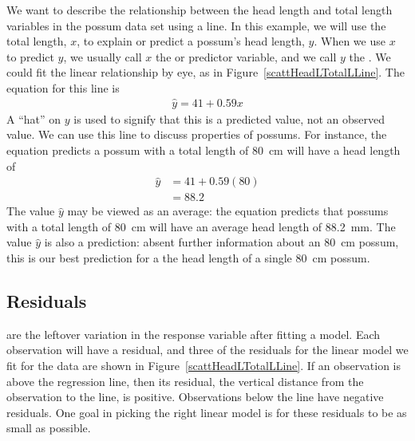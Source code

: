 We want to describe the relationship between the head length and total length variables in the possum data set using a line. In this example, we will use the total length, $x$, to explain or predict a possum's head length, $y$. When we use $x$ to predict $y$, we usually call $x$ the  or predictor variable, and we call $y$ the .  We could fit the linear relationship by eye, as in Figure~\ref{scattHeadLTotalLLine}. The equation for this line is
\begin{eqnarray*}
\hat{y} = 41 + 0.59x
\label{headLLinModTotalL}
\end{eqnarray*}
A ``hat'' on $y$ is used to signify that this is a predicted value, not an observed value.  We can use this line to discuss properties of possums. For instance, the equation predicts a possum with a total length of 80~cm will have a head length of
\begin{align*}
\hat{y} &= 41 + 0.59(80) \\
	&= 88.2 %
\end{align*}
The value $\hat{y}$ may be viewed as an average: the equation predicts that possums with a total length of 80~cm will have an average head length of 88.2~mm. The value $\hat{y}$ is also a prediction:  absent further information about an 80~cm possum, this is our best prediction for a the head length of a single 80~cm possum.  


\D{\newpage}

\subsection{Residuals}


 are the leftover variation in the response variable after fitting a model.  Each observation will have a residual, and three of the residuals for the linear model we fit for the  data are shown in Figure~\ref{scattHeadLTotalLLine}.  If an observation is above the regression line, then its residual, the vertical distance from the observation to the line, is positive.  Observations below the line have negative residuals.  One goal in picking the right linear model is for these residuals to be as small as possible.

